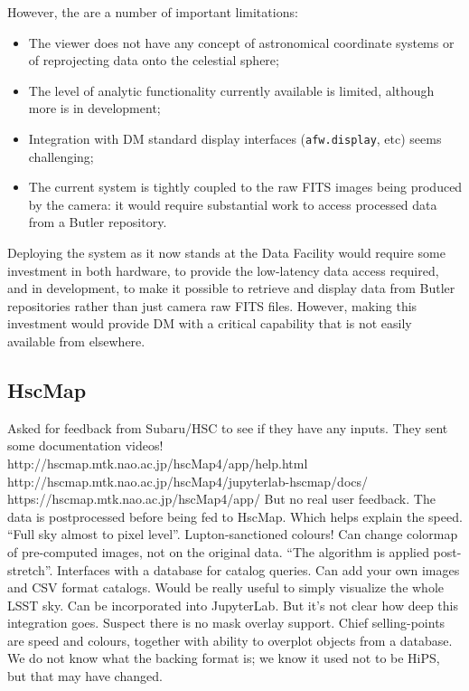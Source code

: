 However, the are a number of important limitations:

\begin{itemize}

  \item{The viewer does not have any concept of astronomical coordinate systems or of reprojecting data onto the celestial sphere;}
  \item{The level of analytic functionality currently available is limited, although more is in development;}
  \item{Integration with DM standard display interfaces (\texttt{afw.display}, etc) seems challenging;}
  \item{The current system is tightly coupled to the raw FITS images being produced by the camera: it would require substantial work to access processed data from a Butler repository.}

\end{itemize}

Deploying the system as it now stands at the Data Facility would require some investment in both hardware, to provide the low-latency data access required, and in development, to make it possible to retrieve and display data from Butler repositories rather than just camera raw FITS files.
However, making this investment would provide DM with a critical capability that is not easily available from elsewhere.


\subsection{HscMap}

Asked for feedback from Subaru/HSC to see if they have any inputs.
They sent some documentation videos!
http://hscmap.mtk.nao.ac.jp/hscMap4/app/help.html
http://hscmap.mtk.nao.ac.jp/hscMap4/jupyterlab-hscmap/docs/
https://hscmap.mtk.nao.ac.jp/hscMap4/app/
But no real user feedback.
The data is postprocessed before being fed to HscMap.
Which helps explain the speed.
``Full sky almost to pixel level''.
Lupton-sanctioned colours!
Can change colormap of pre-computed images, not on the original data.
``The algorithm is applied post-stretch''.
Interfaces with a database for catalog queries.
Can add your own images and CSV format catalogs.
Would be really useful to simply visualize the whole LSST sky.
Can be incorporated into JupyterLab.
But it's not clear how deep this integration goes.
Suspect there is no mask overlay support.
Chief selling-points are speed and colours, together with ability to overplot objects from a database.
We do not know what the backing format is; we know it used not to be HiPS, but that may have changed.

